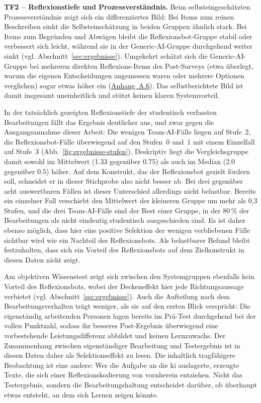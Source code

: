 \textbf{TF2 -- Reflexionstiefe und Prozessverständnis.} Beim selbsteingeschätzten Prozessverständnis
zeigt sich ein differenziertes Bild: Bei Items zum reinen Beschreiben sinkt die Selbsteinschätzung in
beiden Gruppen ähnlich stark. Bei Items zum Begründen und Abwägen bleibt die Reflexionsbot-Gruppe
stabil oder verbessert sich leicht, während sie in der Generic-AI-Gruppe durchgehend weiter sinkt
(vgl. Abschnitt~\ref{sec:ergebnisse}). Umgekehrt schätzt sich die Generic-AI-Gruppe bei mehreren
direkten Reflexions-Items des Post-Surveys (etwa \glqq überlegt, warum die eigenen Entscheidungen
angemessen waren\grqq{} oder \glqq mehrere Optionen verglichen\grqq{}) sogar etwas höher ein
(\hyperref[app:statistik]{Anhang~A.6}). Das selbstberichtete Bild ist damit insgesamt uneinheitlich und stützt keinen klaren
Systemvorteil.

In der tatsächlich gezeigten Reflexionstiefe der studentisch verfassten Bearbeitungen fällt das
Ergebnis deutlicher aus, und zwar gegen die Ausgangsannahme dieser Arbeit: Die wenigen Team-AI-Fälle
liegen auf Stufe~2, die Reflexionsbot-Fälle überwiegend auf den Stufen~0 und~1 mit einem Einzelfall
auf Stufe~3 (Abb.~\ref{fig:ergebnisse-stufen}). Deskriptiv liegt die Vergleichsgruppe damit sowohl im
Mittelwert (1.33 gegenüber 0.75) als auch im Median (2.0 gegenüber 0.5) höher. Auf dem Konstrukt, das
der Reflexionsbot gezielt fördern soll, schneidet er in dieser Stichprobe also nicht besser ab. Bei
drei gegenüber acht auswertbaren Fällen ist dieser Unterschied allerdings nicht belastbar. Bereits ein
einzelner Fall verschiebt den Mittelwert der kleineren Gruppe um mehr als 0,3 Stufen, und die drei
Team-AI-Fälle sind der Rest einer Gruppe, in der 80\,\% der Bearbeitungen als nicht eindeutig
studentisch ausgeschieden sind. Es ist daher ebenso möglich, dass hier eine positive Selektion der
wenigen verbliebenen Fälle sichtbar wird wie ein Nachteil des Reflexionsbots. Als belastbarer Befund
bleibt festzuhalten, dass sich ein Vorteil des Reflexionsbots auf dem Zielkonstrukt in diesen Daten
nicht zeigt.

Am objektiven Wissenstest zeigt sich zwischen den Systemgruppen ebenfalls kein Vorteil des
Reflexionsbots, wobei der Deckeneffekt hier jede Richtungsaussage verbietet
(vgl. Abschnitt~\ref{sec:ergebnisse}). Auch die Aufteilung nach dem Bearbeitungsverhalten trägt
weniger, als sie auf den ersten Blick verspricht: Die eigenständig arbeitenden Personen lagen bereits
im Prä-Test durchgehend bei der vollen Punktzahl, sodass ihr besseres Post-Ergebnis überwiegend eine
vorbestehende Leistungsdifferenz abbildet und keinen Lernzuwachs. Der Zusammenhang zwischen
eigenständiger Bearbeitung und Testergebnis ist in diesen Daten daher als Selektionseffekt zu lesen.
Die inhaltlich tragfähigere Beobachtung ist eine andere: Wer die Aufgabe an die \acrshort{ki}
auslagerte, erzeugte Texte, die sich einer Reflexionskodierung von vornherein entziehen. Nicht das
Testergebnis, sondern die Bearbeitungshaltung entscheidet darüber, ob überhaupt etwas entsteht, an dem
sich Lernen zeigen könnte.


